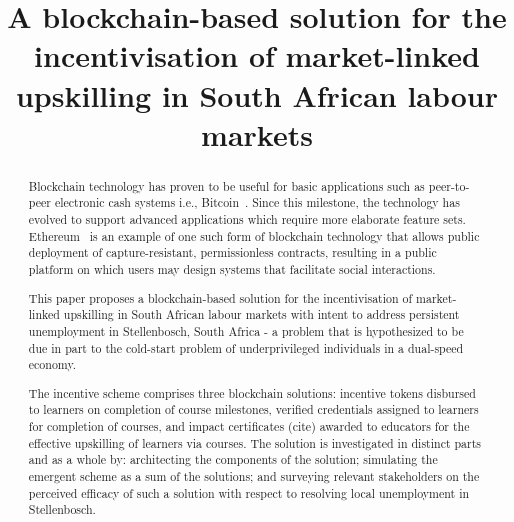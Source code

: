 \documentclass[conference]{IEEEtran}
\begin{document}
\title{A blockchain-based solution for the incentivisation of market-linked upskilling in South African labour markets}

\author{
	\and

}

\maketitle

\begin{abstract}
	Blockchain technology has proven to be useful for basic applications such as peer-to-peer electronic cash systems i.e., Bitcoin~\cite{nakamoto2008bitcoin}.  Since this milestone, the technology has evolved to support advanced applications which require more elaborate feature sets. Ethereum~\cite{buterin2014ethereum} is an example of one such form of blockchain technology that allows public deployment of capture-resistant, permissionless contracts, resulting in a public platform on which users may design systems that facilitate social interactions.

	This paper proposes a blockchain-based solution for the incentivisation of market-linked upskilling in South African labour markets with intent to address persistent unemployment in Stellenbosch, South Africa - a problem that is hypothesized to be due in part to the cold-start problem of underprivileged individuals in a dual-speed economy.

	The incentive scheme comprises three blockchain solutions: incentive tokens disbursed to learners on completion of course milestones, verified credentials assigned to learners for completion of courses, and impact certificates (cite) awarded to educators for the effective upskilling of learners via courses.
	The solution is investigated in distinct parts and as a whole by: architecting the components of the solution; simulating the emergent scheme as a sum of the solutions; and surveying relevant stakeholders on the perceived efficacy of such a solution with respect to resolving local unemployment in Stellenbosch.

\end{abstract}
\end{document}
